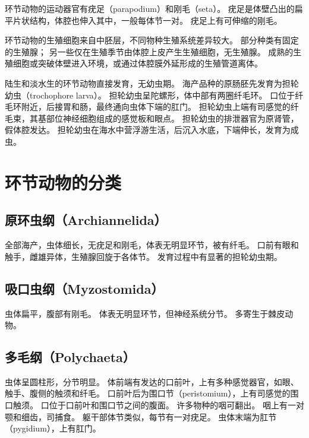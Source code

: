 \documentclass[11pt]{article}
\begin{document}
\newline

环节动物的运动器官有疣足（parapodium）和刚毛（seta）。
疣足是体壁凸出的扁平片状结构，体腔也伸入其中，一般每体节一对。
疣足上有可伸缩的刚毛。

\newline

环节动物的生殖细胞来自中胚层，不同物种生殖系统差异较大。
部分种类有固定的生殖腺；
另一些仅在生殖季节由体腔上皮产生生殖细胞，无生殖腺。
成熟的生殖细胞或突破体壁进入环境，或通过体腔膜外延形成的生殖管道离体。

\newline

陆生和淡水生的环节动物直接发育，无幼虫期。
海产品种的原肠胚先发育为担轮幼虫（trochophore larva）。
担轮幼虫呈陀螺形，体中部有两圈纤毛环。
口位于纤毛环附近，后接胃和肠，最终通向虫体下端的肛门。
担轮幼虫上端有司感觉的纤毛束，其基部位神经细胞组成的感觉板和眼点。
担轮幼虫的排泄器官为原肾管，假体腔发达。
担轮幼虫在海水中营浮游生活，后沉入水底，下端伸长，发育为成虫。
  
\section{环节动物的分类}
\subsection{原环虫纲（Archiannelida）}
全部海产，虫体细长，无疣足和刚毛，体表无明显环节，被有纤毛。
口前有眼和触手，雌雄异体，生殖腺回旋于各体节。
发育过程中有显著的担轮幼虫期。
  
\subsection{吸口虫纲（Myzostomida）}
虫体扁平，腹部有刚毛。
体表无明显环节，但神经系统分节。
多寄生于棘皮动物。

\subsection{多毛纲（Polychaeta）}
虫体呈圆柱形，分节明显。
体前端有发达的口前叶，上有多种感觉器官，如眼、触手、腹侧的触须和纤毛。
口前叶后为围口节（peristomium），上有司感觉的围口触须。
口位于口前叶和围口节之间的腹面。
许多物种的咽可翻出。
咽上有一对颚和细齿，司捕食。
躯干部体节类似，每节有一对疣足。
虫体末端为肛节（pygidium），上有肛门。

\newline
\end{document}
